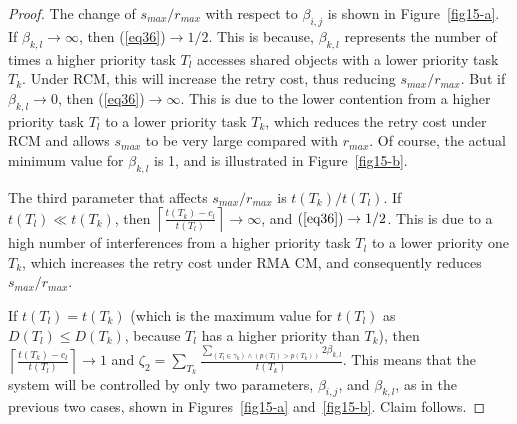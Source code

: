 \documentclass[a4paper,english]{article}
\newtheorem{proof}{Proof}
\begin{document}
\begin{proof}
The change of $s_{max}/r_{max}$ with respect to $\beta_{i,j}$ is shown in Figure~\ref{fig15-a}.
If $\beta_{k,l}\rightarrow\infty$, then (\ref{eq36})$\rightarrow1/2$.
This is because, $\beta_{k,l}$ represents the number of times
a higher priority task $T_{l}$ accesses shared objects with a lower
priority task $T_{k}$. Under RCM, this will increase the retry 
cost, thus reducing $s_{max}/r_{max}$. But if $\beta_{k,l}\rightarrow0$, then (\ref{eq36})$\rightarrow\infty$. This is due to the lower contention from a higher priority task $T_{l}$ to a lower priority task $T_{k}$, which reduces the retry cost under RCM and allows $s_{max}$ to be very large compared with $r_{max}$. Of course, the actual minimum value for $\beta_{k,l}$ is 1, and is illustrated in Figure~\ref{fig15-b}.

The third parameter that affects $s_{max}/r_{max}$ is $t(T_{k})/t(T_{l})$.
If $t(T_{l})\ll t(T_{k})$, then $\left\lceil\frac{t(T_{k})-c_{l}}{t(T_{l})}\right\rceil\rightarrow\infty$,
and $(\ref{eq36})\rightarrow1/2$. This is due to a high number
of interferences from a higher priority task $T_{l}$ to a lower priority
one $T_{k}$, which increases the retry cost under RMA CM, and consequently reduces $s_{max}/r_{max}$. 

If $t(T_{l})=t(T_{k})$ (which is
the maximum value for $t(T_{l})$ as $D(T_{l})\le D(T_{k})$, because
$T_{l}$ has a higher priority than $T_{k}$), then $\left\lceil\frac{t(T_{k})-c_{l}}{t(T_{l})}\right\rceil\rightarrow1$
and $\zeta_2=\sum_{T_{k}}\frac{\sum_{\left(T_{l}\in\gamma_{k}\right)\wedge\left(p\left(T_{l}\right)>p\left(T_{k}\right)\right)}2\beta_{k,l}}{t\left(T_{k}\right)}$. 
This means that the system will be controlled by only two parameters, $\beta_{i,j}$, and $\beta_{k,l}$, as in the previous two cases, shown in Figures~\ref{fig15-a} and~\ref{fig15-b}. Claim follows.
\end{proof}
\end{document}
